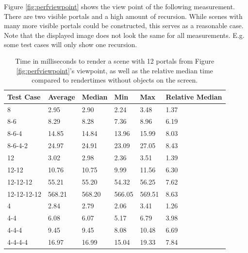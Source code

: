 Figure \ref{fig:perfviewpoint} shows the view point of the following measurement. There are two visible portals and a high amount of recursion. While scenes with many more visible portals could be constructed, this serves as a reasonable case. Note that the displayed image does not look the same for all measurements. E.g. some test cases will only show one recursion.

\begin{table}[H]
	\centering
	\begin{tabular}{|l|l|l|l|l|l|}
		\hline
		Test Case   & Average & Median & Min    & Max    & Relative Median \\ \hline
		8           & 2.95    & 2.90   & 2.24   & 3.48   & 1.37            \\ \hline
		8-6         & 8.29    & 8.28   & 7.36   & 8.96   & 6.19            \\ \hline
		8-6-4       & 14.85   & 14.84  & 13.96  & 15.99  & 8.03            \\ \hline
		8-6-4-2     & 24.97   & 24.91  & 23.09  & 27.05  & 8.43            \\ \hline
		12          & 3.02    & 2.98   & 2.36   & 3.51   & 1.39            \\ \hline
		12-12       & 10.76   & 10.75  & 9.99   & 11.56  & 6.30            \\ \hline
		12-12-12    & 55.21   & 55.20  & 54.32  & 56.25  & 7.62            \\ \hline
		12-12-12-12 & 568.21  & 568.20 & 566.05 & 569.51 & 8.63            \\ \hline
		4           & 2.84    & 2.79   & 2.06   & 3.41   & 1.26            \\ \hline
		4-4         & 6.08    & 6.07   & 5.17   & 6.79   & 3.98            \\ \hline
		4-4-4       & 9.45    & 9.45   & 8.08   & 10.48  & 6.69            \\ \hline
		4-4-4-4     & 16.97   & 16.99  & 15.04  & 19.33  & 7.84            \\ \hline
	\end{tabular}
	\caption{Time in milliseconds to render a scene with 12 portals from Figure \ref{fig:perfviewpoint}'s viewpoint, as well as the relative median time compared to rendertimes without objects on the screen.}
	\label{tab:perfviewpoint}
\end{table}

